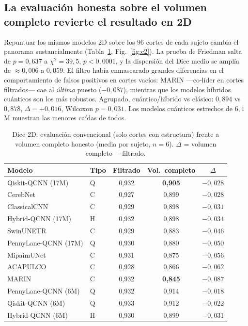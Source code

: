 \documentclass[runningheads]{llncs}
\begin{document}
\subsection{La evaluación honesta sobre el volumen completo revierte el
resultado en 2D}
Repuntuar los mismos modelos 2D sobre los $96$ cortes de cada sujeto cambia el
panorama sustancialmente (Tabla~\ref{tab:c2}, Fig.~\ref{fig:c2}). La prueba de
Friedman salta de $p{=}0{,}637$ a $\chi^2{=}39{,}5$, $p{<}0{,}0001$, y la
dispersión del Dice medio se amplía de ${\approx}0{,}006$ a $0{,}059$. El filtro
había enmascarado grandes diferencias en el comportamiento de falsos positivos
en cortes vacíos: MARIN ---co-líder en cortes filtrados--- cae al \emph{último}
puesto ($-0{,}087$), mientras que los modelos híbridos cuánticos son los más
robustos. Agrupado, cuántico/híbrido vs clásico: $0{,}894$ vs $0{,}878$,
$\Delta{=}{+}0{,}016$, Wilcoxon $p{=}0{,}031$. Los modelos cuánticos estrechos de
$6{,}1$M muestran las menores caídas de todos.

\begin{table}[t]
\centering
\caption{Dice 2D: evaluación convencional (solo cortes con estructura) frente a
volumen completo honesto (media por sujeto, $n{=}6$). $\Delta$ = volumen
completo $-$ filtrado.}
\label{tab:c2}
\setlength{\tabcolsep}{6pt}
\begin{tabular}{llccc}
\toprule
Modelo & Tipo & Filtrado & Vol.\ completo & $\Delta$\\
\midrule
Qiskit-QCNN (17M)    & Q & 0,932 & \textbf{0,905} & $-0,028$\\
CerebNet             & C & 0,927 & 0,899 & $-0,028$\\
ClassicalCNN         & C & 0,929 & 0,898 & $-0,031$\\
Hybrid-QCNN (17M)    & H & 0,932 & 0,898 & $-0,034$\\
SwinUNETR            & C & 0,929 & 0,883 & $-0,046$\\
PennyLane-QCNN (17M) & Q & 0,930 & 0,880 & $-0,050$\\
MipaimUNet           & C & 0,931 & 0,875 & $-0,056$\\
ACAPULCO             & C & 0,928 & 0,866 & $-0,062$\\
MARIN                & C & 0,932 & \textbf{0,845} & $-0,087$\\
\midrule
PennyLane-QCNN (6M)  & Q & 0,932 & 0,914 & $-0,018$\\
Qiskit-QCNN (6M)     & Q & 0,933 & 0,912 & $-0,022$\\
Hybrid-QCNN (6M)     & H & 0,930 & 0,899 & $-0,031$\\
\bottomrule
\end{tabular}
\end{table}
\end{document}
